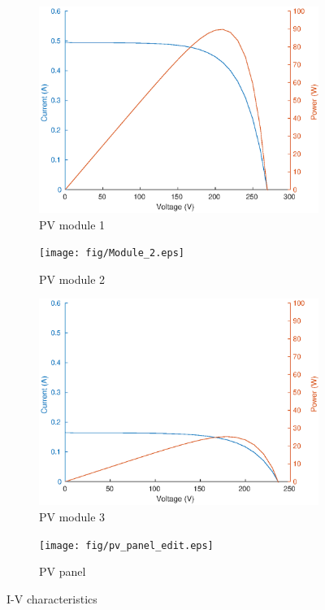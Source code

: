 \documentclass[conference]{IEEEtran}
\begin{document}
\begin{figure}[t]
     \centering
	 \begin{subfigure}[b]{0.3\linewidth}
        \centering
        \includegraphics[width=\linewidth]{fig/Module_3.eps}
        \caption{PV module 1}
    \end{subfigure}
     \begin{subfigure}[b]{0.3\linewidth}
        \centering
        \texttt{[image: fig/Module\_2.eps]}
        \caption{PV module 2}
     \end{subfigure}
	\begin{subfigure}[b]{0.3\linewidth}
        \centering
        \includegraphics[width=\linewidth]{fig/Module_1.eps}
        \caption{PV module 3}
     \end{subfigure}
    \hfill
    \begin{subfigure}[b]{0.5\linewidth}
        \centering
        \vspace{3mm}
        \texttt{[image: fig/pv\_panel\_edit.eps]}
        \caption{PV panel}
    \end{subfigure}
    \caption{I-V characteristics}
    \label{fig:IV}
\end{figure}
\end{document}
